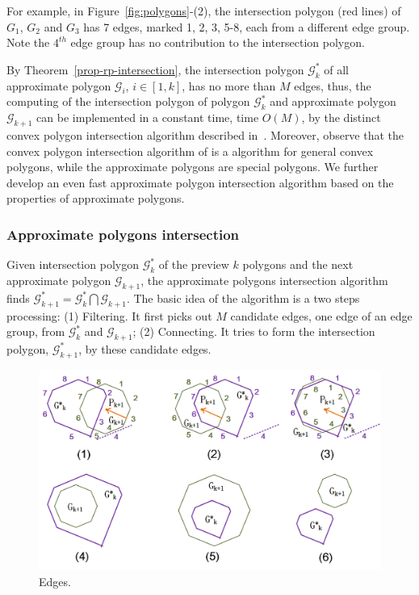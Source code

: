 For example, in Figure~\ref{fig:polygons}-(2), the intersection polygon (red lines) of $G_1$, $G_2$ and $G_3$ has 7 edges, marked 1, 2, 3, 5-8, each from a different edge group. Note the $4^{th}$ edge group has no contribution to the intersection polygon.


By Theorem~\ref{prop-rp-intersection}, the intersection polygon $\mathcal{G}^*_k$ of all approximate polygon $\mathcal{G}_i$, $i \in [1, k]$, has no more than $M$ edges, thus, the computing of the intersection polygon of polygon $\mathcal{G}^*_k$ and approximate polygon $\mathcal{G}_{k+1}$ can be implemented in a constant time, \ie time $O(M)$, by the distinct convex polygon intersection algorithm described in~\cite{ORourke:Intersection}.
%
Moreover, observe that the convex polygon intersection algorithm of \cite{ORourke:Intersection} is a algorithm for general convex polygons, while the approximate polygons are special polygons. We further develop an even fast approximate polygon intersection algorithm based on the properties of approximate polygons.

\subsubsection{Approximate polygons intersection}
Given intersection polygon $\mathcal{G}^*_k$ of the preview $k$ polygons and the next approximate polygon $\mathcal{G}_{k+1}$, the approximate polygons intersection algorithm finds $\mathcal{G}^*_{k+1} = \mathcal{G}^*_k  \bigcap \mathcal{G}_{k+1}$. The basic idea of the algorithm is a two steps processing:
 (1) Filtering. It first picks out $M$ candidate edges, one edge of an edge group, from $\mathcal{G}^*_k $ and $\mathcal{G}_{k+1}$; 
 (2) Connecting. It tries to form the intersection polygon, \ie $\mathcal{G}^*_{k+1}$, by these candidate edges.



\begin{figure}[tb!]
\centering
\includegraphics[scale=0.88]{figures/Fig-poly-edges.png}
\vspace{-1ex}
\caption{\small Edges.}
\vspace{-3ex}
\label{fig:poly-edges}
\end{figure}



